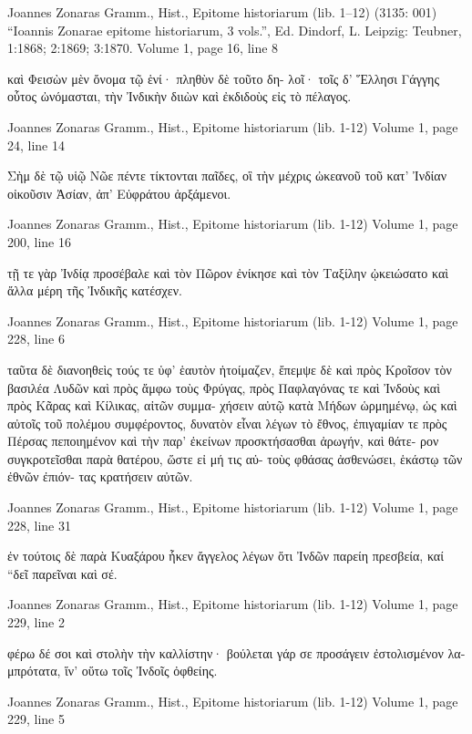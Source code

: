 \documentclass[12pt,letterpaper,twoside,final]{memoir}
\begin{document}
\begin{greek}
Joannes Zonaras Gramm., Hist., Epitome historiarum (lib. 1–12) (3135: 001)
“Ioannis Zonarae epitome historiarum, 3 vols.”, Ed. Dindorf, L.
Leipzig: Teubner, 1:1868; 2:1869; 3:1870.
Volume 1, page 16, line 8

καὶ Φεισὼν μὲν ὄνομα τῷ ἑνί· πληθὺν δὲ τοῦτο δη-
λοῖ· τοῖς δ' Ἕλλησι Γάγγης οὗτος ὠνόμασται, τὴν 
Ἰνδικὴν διιὼν καὶ ἐκδιδοὺς εἰς τὸ πέλαγος. 



Joannes Zonaras Gramm., Hist., Epitome historiarum (lib. 1-12) 
Volume 1, page 24, line 14

Σὴμ δὲ τῷ υἱῷ Νῶε πέντε τίκτονται παῖδες, οἳ 
τὴν μέχρις ὠκεανοῦ τοῦ κατ' Ἰνδίαν οἰκοῦσιν Ἀσίαν, 
ἀπ' Εὐφράτου ἀρξάμενοι. 


Joannes Zonaras Gramm., Hist., Epitome historiarum (lib. 1-12) 
Volume 1, page 200, line 16

                                        τῇ τε γὰρ Ἰνδίᾳ 
προσέβαλε καὶ τὸν Πῶρον ἐνίκησε καὶ τὸν Ταξίλην 
ᾠκειώσατο καὶ ἄλλα μέρη τῆς Ἰνδικῆς κατέσχεν. 



Joannes Zonaras Gramm., Hist., Epitome historiarum (lib. 1-12) 
Volume 1, page 228, line 6

ταῦτα δὲ διανοηθεὶς τούς τε ὑφ' ἑαυτὸν ἡτοίμαζεν, 
ἔπεμψε δὲ καὶ πρὸς Κροῖσον τὸν βασιλέα Λυδῶν καὶ 
πρὸς ἄμφω τοὺς Φρύγας, πρὸς Παφλαγόνας τε καὶ 
Ἰνδοὺς καὶ πρὸς Κᾶρας καὶ Κίλικας, αἰτῶν συμμα-
χήσειν αὐτῷ κατὰ Μήδων ὡρμημένῳ, ὡς καὶ αὐτοῖς 
τοῦ πολέμου συμφέροντος, δυνατὸν εἶναι λέγων τὸ 
ἔθνος, ἐπιγαμίαν τε πρὸς Πέρσας πεποιημένον καὶ 
τὴν παρ' ἐκείνων προσκτήσασθαι ἀρωγήν, καὶ θάτε-
ρον συγκροτεῖσθαι παρὰ θατέρου, ὥστε εἰ μή τις αὐ-
τοὺς φθάσας ἀσθενώσει, ἑκάστῳ τῶν ἐθνῶν ἐπιόν-
τας κρατήσειν αὐτῶν. 



Joannes Zonaras Gramm., Hist., Epitome historiarum (lib. 1-12) 
Volume 1, page 228, line 31

ἐν τούτοις δὲ παρὰ Κυαξάρου ἧκεν ἄγγελος λέγων 
ὅτι Ἰνδῶν παρείη πρεσβεία, καί “δεῖ παρεῖναι καὶ 
σέ. 



Joannes Zonaras Gramm., Hist., Epitome historiarum (lib. 1-12) 
Volume 1, page 229, line 2

     φέρω δέ σοι καὶ στολὴν τὴν καλλίστην· βούλεται   
γάρ σε προσάγειν ἐστολισμένον λαμπρότατα, ἵν' οὕτω 
τοῖς Ἰνδοῖς ὀφθείης. 



Joannes Zonaras Gramm., Hist., Epitome historiarum (lib. 1-12) 
Volume 1, page 229, line 5


\end{greek}
\end{document}
